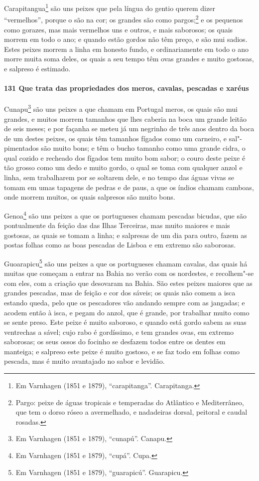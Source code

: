 Carapitangua\footnote{ Em Varnhagen (1851 e 1879), ``carapitanga''. Carapitanga.} são uns
peixes que pela língua do gentio querem dizer ``vermelhos'', porque o são na cor; os
grandes são como pargos;\footnote{ Pargo: peixe de águas tropicais e temperadas do
Atlântico e Mediterrâneo, que tem o dorso róseo a avermelhado, e nadadeiras dorsal,
peitoral e caudal rosadas.} e os pequenos como gorazes, mas mais vermelhos uns e outros,
e mais saborosos; os quais morrem em todo o ano; e quando estão gordos não têm preço, e
são mui sadios. Estes peixes morrem a linha em honesto fundo, e ordinariamente em todo o
ano morre muita soma deles, os quais a seu tempo têm ovas grandes e muito gostosas, e
salpreso é estimado.

\paragraph{131 Que trata das propriedades dos meros, cavalas, pescadas e xaréus}

Cunapu\footnote{ Em Varnhagen (1851 e 1879), ``cunapú''. Canapu.} são uns peixes a que
chamam em Portugal meros, os quais são mui grandes, e muitos morrem tamanhos que lhes
caberia na boca um grande leitão de seis meses; e por façanha se meteu já um negrinho de
três anos dentro da boca de um destes peixes, os quais têm tamanhos fígados como um
carneiro, e sal"-pimentados são muito bons; e têm o bucho tamanho como uma grande cidra, o
qual cozido e recheado dos fígados tem muito bom sabor; o couro deste peixe é tão grosso
como um dedo e muito gordo, o qual se toma com qualquer anzol e linha, sem trabalharem por
se soltarem dele, e no tempo das águas vivas se tomam em umas tapagens de pedras e de
paus, a que os índios chamam camboas, onde morrem muitos, os quais salpresos são muito
bons.

Genoa\footnote{ Em Varnhagen (1851 e 1879), ``cupá''. Cupa.} são uns peixes a que os
portugueses chamam pescadas bicudas, que são pontualmente da feição das das Ilhas
Terceiras, mas muito maiores e mais gostosas, as quais se tomam a linha; e salpresas de um
dia para outro, fazem as postas folhas como as boas pescadas de Lisboa e em extremo são
saborosas.

Guoarapicu\footnote{ Em Varnhagen (1851 e 1879), ``guarapicú''. Guarapicu.} são uns peixes
a que os portugueses chamam cavalas, das quais há muitas que começam a entrar na Bahia no
verão com os nordestes, e recolhem"-se com eles, com a criação que desovaram na Bahia. São
estes peixes maiores que as grandes pescadas, mas de feição e cor dos sáveis; os quais não
comem a isca estando queda, pelo que os pescadores vão andando sempre com as jangadas; e
acodem então à isca, e pegam do anzol, que é grande, por trabalhar muito como se sente
preso. Este peixe é muito saboroso, e quando está gordo sabem as suas ventrechas a sável;
cujo rabo é gordíssimo, e tem grandes ovas, em extremo saborosas; os seus ossos do focinho
se desfazem todos entre os dentes em manteiga; e salpreso este peixe é muito gostoso, e se
faz todo em folhas como pescada, mas é muito avantajado no sabor e levidão.

